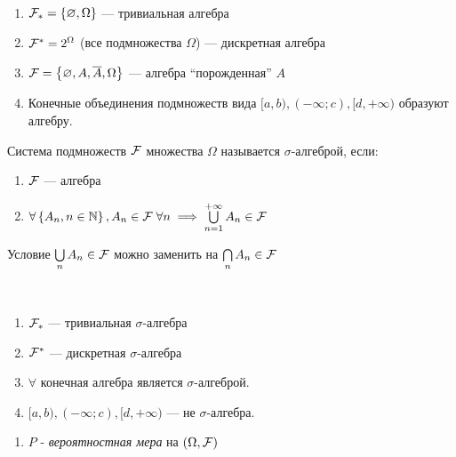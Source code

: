 \begin{example}~
	\begin{enumerate}
		\item $\mathcal{F}_* = \left\{ \varnothing, \Omega \right\}$ --- тривиальная алгебра
		\item $\mathcal{F}^* = 2^\Omega$ (все подмножества $\Omega$) --- дискретная алгебра
		\item $\mathcal{F} = \left\{ \varnothing, A, \overline{A}, \Omega \right\}$ --- алгебра ``порожденная'' $A$
		\item Конечные объединения подмножеств вида 
					$[a, b), (-\infty; c), [d, +\infty)$ образуют алгебру.\\
	\end{enumerate}
\end{example}

\begin{definition}
	Система подмножеств $\mathcal{F}$ множества $\Omega$ называется $\sigma$-алгеброй, если:
	\begin{enumerate}
		\item $\mathcal{F}$ --- алгебра
		\item $\forall \left\{ A_n, n \in \mathbb{N} \right\}, A_n \in \mathcal{F} \; \forall n 
					\implies \bigcup\limits_{n = 1}^{+\infty} A_n \in \mathcal{F}$\\
	\end{enumerate}
\end{definition}

\begin{exercise}
	Условие $\bigcup\limits_n A_n \in \mathcal{F}$ можно заменить на $\bigcap\limits_n A_n \in \mathcal{F}$
\end{exercise}

\begin{example}~
	\begin{enumerate}
		\item $\mathcal{F}_* $ --- тривиальная $\sigma$-алгебра
		\item $\mathcal{F}^* $ --- дискретная $\sigma$-алгебра
		\item $\forall$ конечная алгебра является $\sigma$-алгеброй.
		\item $[a, b), (-\infty; c), [d, +\infty)$ --- не $\sigma$-алгебра.\\
	\end{enumerate}
\end{example}

\begin{enumerate}[resume*=kolm_triple]
	\item
		$P$ - \emph{вероятностная мера} на $(\Omega, \mathcal{F})$
\end{enumerate}

